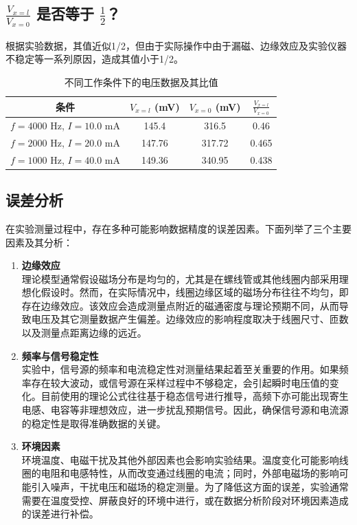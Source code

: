 \documentclass[12pt,a4paper]{article}
\begin{document}
	\subsection{\( \frac{V_{x=l}}{V_{x=0}} \) 是否等于 \(\frac{1}{2}\)？}
	根据实验数据，其值近似1/2，但由于实际操作中由于漏磁、边缘效应及实验仪器不稳定等一系列原因，造成其值小于1/2。
		\begin{table}[h]
		\centering
		\caption{不同工作条件下的电压数据及其比值}
		\begin{tabular}{cccc}
		\hline
		条件 & \(V_{x=l}\) (mV) & \(V_{x=0}\) (mV) & \(\displaystyle \frac{V_{x=l}}{V_{x=0}}\) \\
		\hline
		\(f=4000\) Hz, \(I=10.0\) mA & 145.4  & 316.5  & 0.46 \\
		\(f=2000\) Hz, \(I=20.0\) mA & 147.76 & 317.72 & 0.465 \\
		\(f=1000\) Hz, \(I=40.0\) mA & 149.36 & 340.95 & 0.438 \\
		\hline
		\end{tabular}
		\end{table}
	
	\subsection{误差分析}

	在实验测量过程中，存在多种可能影响数据精度的误差因素。下面列举了三个主要因素及其分析：
	\begin{enumerate}
    \item \textbf{边缘效应} \\
    理论模型通常假设磁场分布是均匀的，尤其是在螺线管或其他线圈内部采用理想化假设时。然而，在实际情况中，线圈边缘区域的磁场分布往往不均匀，即存在边缘效应。该效应会造成测量点附近的磁通密度与理论预期不同，从而导致电压及其它测量数据产生偏差。边缘效应的影响程度取决于线圈尺寸、匝数以及测量点距离边缘的远近。
    \item \textbf{频率与信号稳定性} \\
    实验中，信号源的频率和电流稳定性对测量结果起着至关重要的作用。如果频率存在较大波动，或信号源在采样过程中不够稳定，会引起瞬时电压值的变化。目前使用的理论公式往往基于稳态信号进行推导，高频下亦可能出现寄生电感、电容等非理想效应，进一步扰乱预期信号。因此，确保信号源和电流源的稳定性是取得准确数据的关键。
    \item \textbf{环境因素} \\
    环境温度、电磁干扰及其他外部因素也会影响实验结果。温度变化可能影响线圈的电阻和电感特性，从而改变通过线圈的电流；同时，外部电磁场的影响可能引入噪声，干扰电压和磁场的稳定测量。为了降低这方面的误差，实验通常需要在温度受控、屏蔽良好的环境中进行，或在数据分析阶段对环境因素造成的误差进行补偿。
	\end{enumerate}
\end{document}
